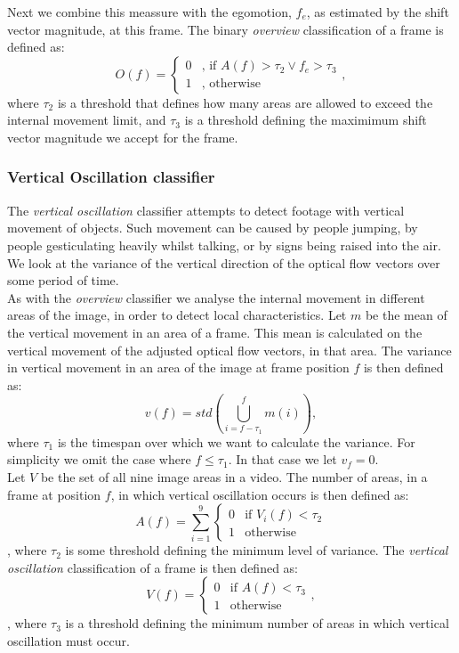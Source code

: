  Next we combine this meassure with the egomotion, $f_{e}$, as estimated by the shift vector magnitude, at this frame. The binary \textit{overview} classification of a frame is defined as:
\begin{equation}
O(f) =
\begin{cases}
0 & \text{, if } A(f) > \tau_{2} \vee f_{e} > \tau_{3} \\
1 &  \text{, otherwise}
\end{cases},
\end{equation}
where $\tau_{2}$ is a threshold that defines how many areas are allowed to exceed the internal movement limit, and $\tau_{3}$ is a threshold defining the maximimum shift vector magnitude we accept for the frame.
%
\subsubsection{Vertical Oscillation classifier}\label{sec:verticaloscillationclassifier}
%
The \textit{vertical oscillation} classifier attempts to detect footage with vertical movement of objects. Such movement can be caused by people jumping, by people gesticulating heavily whilst talking, or by signs being raised into the air. We look at the variance of the vertical direction of the optical flow vectors over some period of time.\\
As with the \textit{overview} classifier we analyse the internal movement in different areas of the image, in order to detect local characteristics. Let $m$ be the mean of the vertical movement in an area of a frame. This mean is calculated on the vertical movement of the adjusted optical flow vectors, in that area. The variance in vertical movement in an area of the image at frame position $f$ is then defined as:
%
\begin{equation}
v(f) = std \left (\bigcup_{i=f-\tau_1}^{f} m(i) \right ),
\end{equation}
%
where $\tau_1$ is the timespan over which we want to calculate the variance. For simplicity we omit the case where $f \leq \tau_1$. In that case we let $v_{f} = 0$.\\
Let $V$ be the set of all nine image areas in a video. The number of areas, in a frame at position $f$, in which vertical oscillation occurs is then defined as:
%
\begin{equation}
A(f) = \sum_{i=1}^{9}
\begin{cases}
0 & \text{if } V_{i}(f) < \tau_2\\
1 &  \text{otherwise}
\end{cases}
\end{equation},
%
where $\tau_2$ is some threshold defining the minimum level of variance. The \textit{vertical oscillation} classification of a frame is then defined as:
%
\begin{equation}
V(f) =
\begin{cases}
0 & \text{if } A(f) < \tau_3\\
1 &  \text{otherwise}
\end{cases},
\end{equation},
%
where $\tau_3$ is a threshold defining the minimum number of areas in which vertical oscillation must occur.
%
%
